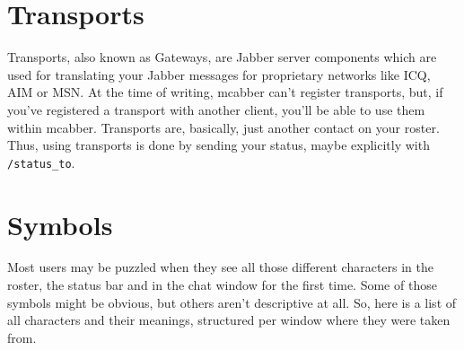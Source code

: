 \documentclass[12pt,oneside,a4]{book}
\begin{document}
\section{Transports}
Transports, also known as Gateways, are Jabber server components which are used for translating your Jabber messages
for proprietary networks like ICQ, AIM or MSN. At the time of writing, mcabber can't register transports, but,
if you've registered a transport with another client, you'll be able to use them within mcabber.
Transports are, basically, just another contact on your roster. Thus, using transports is done by sending your status,
maybe explicitly with \verb+/status_to+.
\section{Symbols}
Most users may be puzzled when they see all those different characters in the roster, the status bar and
in the chat window for the first time. Some of those symbols might be obvious, but others aren't descriptive at all.
So, here is a list of all characters and their meanings, structured per window where they were taken from. \\
\end{document}
